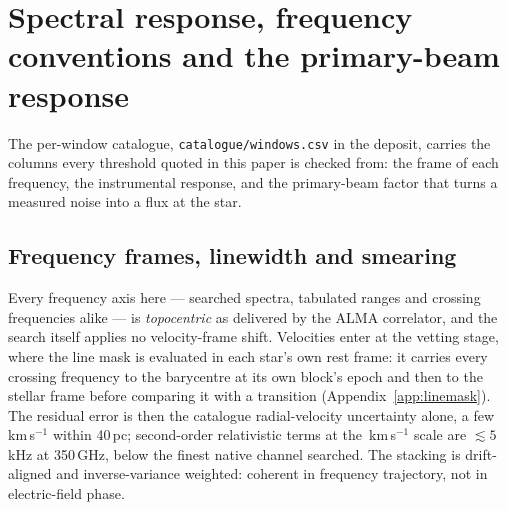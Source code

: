 \section{Spectral response, frequency conventions and the primary-beam
response}
\label{app:conventions}

The per-window catalogue, \texttt{catalogue/windows.csv} in the deposit,
carries the columns every threshold quoted in this paper is checked from:
the frame of each frequency, the instrumental response, and the primary-beam
factor that turns a measured noise into a flux at the star.



\subsection{Frequency frames, linewidth and smearing}

Every frequency axis here --- searched spectra, tabulated ranges and
crossing frequencies alike --- is \emph{topocentric} as delivered by the
ALMA correlator, and the search itself applies no velocity-frame shift.
Velocities enter at the vetting stage, where the line mask is evaluated in
each star's own rest frame: it carries every crossing frequency to the
barycentre at its own block's epoch and then to the stellar frame before
comparing it with a transition (Appendix~\ref{app:linemask}). The residual
error is then the catalogue radial-velocity uncertainty alone, a few
km\,s$^{-1}$ within 40\,pc; second-order relativistic terms at the
\MaskHalfKms\,km\,s$^{-1}$
scale are $\lesssim5$\,kHz at 350\,GHz, below the finest native channel
searched. The stacking is drift-aligned and inverse-variance weighted:
coherent in frequency trajectory, not in electric-field phase.

